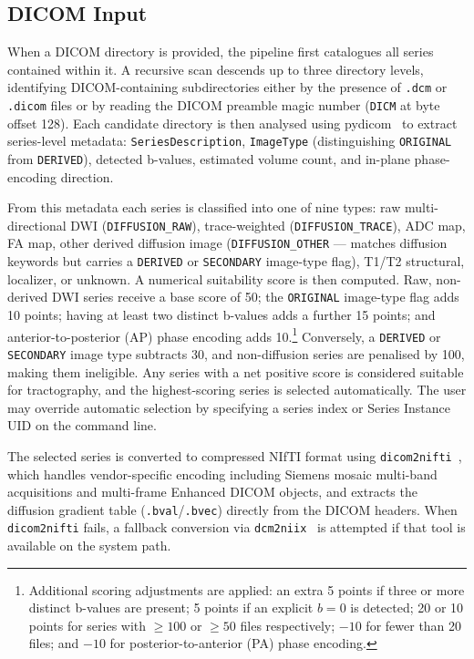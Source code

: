 \subsection{DICOM Input}
\label{subsec:methods_dicom}

When a DICOM directory is provided, the pipeline first catalogues all series contained within it. A recursive scan descends up to three directory levels, identifying DICOM-containing subdirectories either by the presence of \texttt{.dcm} or \texttt{.dicom} files or by reading the DICOM preamble magic number (\texttt{DICM} at byte offset 128). Each candidate directory is then analysed using pydicom~\cite{darcy_mason_2024_13824606} to extract series-level metadata: \texttt{SeriesDescription}, \texttt{ImageType} (distinguishing \texttt{ORIGINAL} from \texttt{DERIVED}), detected b-values, estimated volume count, and in-plane phase-encoding direction.

From this metadata each series is classified into one of nine types: raw multi-directional DWI (\texttt{DIFFUSION\_RAW}), trace-weighted (\texttt{DIFFUSION\_TRACE}), ADC map, FA map, other derived diffusion image (\texttt{DIFFUSION\_OTHER} --- matches diffusion keywords but carries a \texttt{DERIVED} or \texttt{SECONDARY} image-type flag), T1/T2 structural, localizer, or unknown. A numerical suitability score is then computed. Raw, non-derived DWI series receive a base score of 50; the \texttt{ORIGINAL} image-type flag adds 10 points; having at least two distinct b-values adds a further 15 points; and anterior-to-posterior (AP) phase encoding adds 10.\footnote{Additional scoring adjustments are applied: an extra 5 points if three or more distinct b-values are present; 5 points if an explicit $b = 0$ is detected; 20 or 10 points for series with $\geq 100$ or $\geq 50$ files respectively; $-10$ for fewer than 20 files; and $-10$ for posterior-to-anterior (PA) phase encoding.} Conversely, a \texttt{DERIVED} or \texttt{SECONDARY} image type subtracts 30, and non-diffusion series are penalised by 100, making them ineligible. Any series with a net positive score is considered suitable for tractography, and the highest-scoring series is selected automatically. The user may override automatic selection by specifying a series index or Series Instance UID on the command line.

The selected series is converted to compressed NIfTI format using \texttt{dicom2nifti}~\cite{dicom2nifti}, which handles vendor-specific encoding including Siemens mosaic multi-band acquisitions and multi-frame Enhanced DICOM objects, and extracts the diffusion gradient table (\texttt{.bval}/\texttt{.bvec}) directly from the DICOM headers. When \texttt{dicom2nifti} fails, a fallback conversion via \texttt{dcm2niix}~\cite{li2016first} is attempted if that tool is available on the system path.

